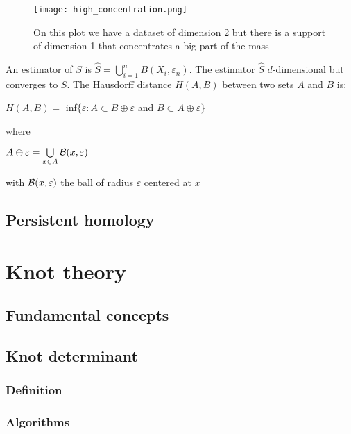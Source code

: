\documentclass[12pt, a4paper]{article}
\begin{document}
\begin{figure}[p]
  \centering
  \texttt{[image: high\_concentration.png]}
  \caption{On this plot we have a dataset of dimension 2 but there is a support of dimension 1 that concentrates a big part of the mass}
  \label{fig:high_concentration}
\end{figure}

\newpage

An estimator of $S$ is $\widehat{S} = \bigcup^n_{i=1} B(X_i, \varepsilon_n)$. The estimator $\widehat{S}$ $d$-dimensional but converges to $S$. The Hausdorff distance $H(A,B)$ between two sets $A$ and $B$ is:

\begin{center}
  $H(A,B) =$ inf$ \lbrace \varepsilon : A \subset B \oplus \varepsilon$ and $B \subset A \oplus \varepsilon \rbrace$ 
\end{center}

where 

\begin{center}
  $A \oplus \varepsilon = \bigcup\limits_{x \in A} \mathcal{B}(x,\varepsilon)$ 
\end{center}

with $\mathcal{B}(x, \varepsilon)$ the ball of radius $\varepsilon$ centered at $x$

\subsection{Persistent homology}

\newpage
\thispagestyle{empty}
\mbox{}
\newpage

\section{Knot theory}

\subsection{Fundamental concepts}

\subsection{Knot determinant}

\subsubsection{Definition}

\subsubsection{Algorithms}
\end{document}
